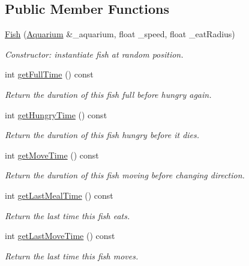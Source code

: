 \subsection*{Public Member Functions}
\begin{DoxyCompactItemize}
\item 
\mbox{\hyperlink{class_fish_aede64f7ce29fcda26276bb24a5aa509d}{Fish}} (\mbox{\hyperlink{class_aquarium}{Aquarium}} \&\+\_\+aquarium, float \+\_\+speed, float \+\_\+eat\+Radius)
\begin{DoxyCompactList}\small\item\em Constructor\+: instantiate fish at random position. \end{DoxyCompactList}\item 
int \mbox{\hyperlink{class_fish_aad3fb1122b2fbb928f854d73726aa234}{get\+Full\+Time}} () const
\begin{DoxyCompactList}\small\item\em Return the duration of this fish full before hungry again. \end{DoxyCompactList}\item 
int \mbox{\hyperlink{class_fish_abcd4464c7dce28026fe2738b75576875}{get\+Hungry\+Time}} () const
\begin{DoxyCompactList}\small\item\em Return the duration of this fish hungry before it dies. \end{DoxyCompactList}\item 
int \mbox{\hyperlink{class_fish_a3a337242dce822aeb5a0e063d7b99e39}{get\+Move\+Time}} () const
\begin{DoxyCompactList}\small\item\em Return the duration of this fish moving before changing direction. \end{DoxyCompactList}\item 
int \mbox{\hyperlink{class_fish_a078c712871cc4e9f7d3ed98a6c95f12e}{get\+Last\+Meal\+Time}} () const
\begin{DoxyCompactList}\small\item\em Return the last time this fish eats. \end{DoxyCompactList}\item 
int \mbox{\hyperlink{class_fish_a4ddf35ce18487be8976ba505e50693b2}{get\+Last\+Move\+Time}} () const
\begin{DoxyCompactList}\small\item\em Return the last time this fish moves. \end{DoxyCompactList}\item 

\end{DoxyCompactItemize}
